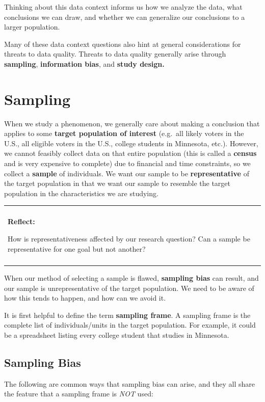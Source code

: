 \documentclass[
]{book}
\newenvironment{reflect}
{
    \begin{center}
    
    \begin{tabular}{|p{0.8\textwidth}|}
    \rowcolor{LightBlue}
    \hline\\
    \rowcolor{LightBlue}
    \textbf{Reflect:}
}
{
    \\\rowcolor{LightBlue}
    \\\hline
    \end{tabular} 
    \end{center}
}
\begin{document}
Thinking about this data context informs us how we analyze the data, what conclusions we can draw, and whether we can generalize our conclusions to a larger population.

Many of these data context questions also hint at general considerations for threats to data quality. Threats to data quality generally arise through \textbf{sampling}, \textbf{information bias}, and \textbf{study design.}

\section{Sampling}\label{sampling}

When we study a phenomenon, we generally care about making a conclusion that applies to some \textbf{target population of interest} (e.g.~all likely voters in the U.S., all eligible voters in the U.S., college students in Minnesota, etc.). However, we cannot feasibly collect data on that entire population (this is called a \textbf{census} and is very expensive to complete) due to financial and time constraints, so we collect a \textbf{sample} of individuals. We want our sample to be \textbf{representative} of the target population in that we want our sample to resemble the target population in the characteristics we are studying.

\begin{reflect}
How is representativeness affected by our research question? Can a
sample be representative for one goal but not another?
\end{reflect}

When our method of selecting a sample is flawed, \textbf{sampling bias} can result, and our sample is unrepresentative of the target population. We need to be aware of how this tends to happen, and how can we avoid it.

It is first helpful to define the term \textbf{sampling frame}. A sampling frame is the complete list of individuals/units in the target population. For example, it could be a spreadsheet listing every college student that studies in Minnesota.

\subsection{Sampling Bias}\label{sampling-bias}

The following are common ways that sampling bias can arise, and they all share the feature that a sampling frame is \emph{NOT} used:
\end{document}

